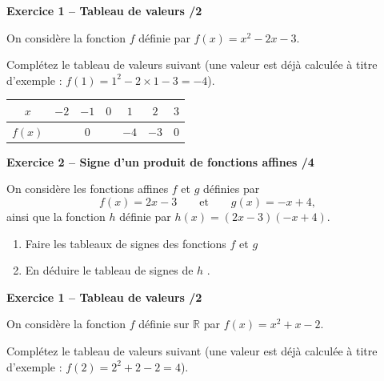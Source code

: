 \documentclass[10pt,a4paper]{article}
\begin{document}

\begin{sujets}


\textbf{Exercice 1 -- Tableau de valeurs \hfill /2}

On considère la fonction \(f\) définie  par \(f(x)=x^2-2x-3\).

Complétez le tableau de valeurs suivant (une valeur est déjà calculée à titre d'exemple : \(f(1)=1^2-2\times 1-3=-4\)).

\begin{center}
    \renewcommand{\arraystretch}{1.5}
    \setlength{\tabcolsep}{0.25cm}
    \begin{tabular}{|*{7}{c|}}
    \hline
    \(x\) & \(-2\) & \(-1\) & \(0\) & \(1\) & \(2\) & \(3\) \\
    \hline
    \(f(x)\) & & \(0\) & & \(-4\) & \(-3\) & \(0\) \\
    \hline
    \end{tabular}
\end{center}


\textbf{Exercice 2 -- Signe d'un produit de fonctions affines \hfill /4}

On considère les fonctions affines \(f\) et \(g\) définies par
\[
f(x)=2x-3 \qquad\text{et}\qquad g(x)=-x+4,
\]
ainsi que la fonction \(h\) définie  par \(h(x)=(2x-3)(-x+4)\).

\begin{enumerate}
\item Faire les tableaux de signes des fonctions \(f\) et \(g\)

\vspace{4cm}

\item En déduire le tableau de signes de \(h\) .

\vspace{4cm}

\end{enumerate}

\text{ }
\columnbreak


\textbf{Exercice 1 -- Tableau de valeurs \hfill /2}

On considère la fonction \(f\) définie sur \(\mathbb{R}\) par \(f(x)=x^2+x-2\).

Complétez le tableau de valeurs suivant (une valeur est déjà calculée à titre d'exemple : \(f(2)=2^2+2-2=4\)).


\end{sujets}
\end{document}
